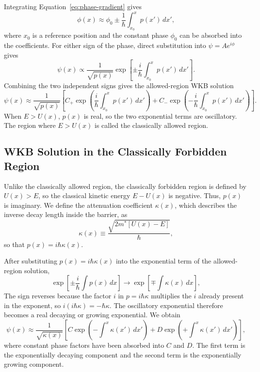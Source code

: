 \documentclass[12pt]{article}
\begin{document}
Integrating Equation~\eqref{eq:phase-gradient} gives
\begin{equation}
    \phi(x)\approx\phi_0
    \pm\frac{1}{\hbar}\int_{x_0}^{x}p(x')\,dx',
    \label{eq:wkb-phase}
\end{equation}
where \(x_0\) is a reference position and the constant phase \(\phi_0\) can be absorbed into the coefficients. For either sign of the phase, direct substitution into \(\psi=Ae^{i\phi}\) gives
\[
    \psi(x)\propto
    \frac{1}{\sqrt{p(x)}}
    \exp\left[
        \pm\frac{i}{\hbar}\int_{x_0}^{x}p(x')\,dx'
    \right].
\]
Combining the two independent signs gives the allowed-region WKB solution
\begin{equation}
    \psi(x)\approx
    \frac{1}{\sqrt{p(x)}}
    \left[
        C_{+}\exp\left(\frac{i}{\hbar}\int_{x_0}^{x}p(x')\,dx'\right)
        +C_{-}\exp\left(-\frac{i}{\hbar}\int_{x_0}^{x}p(x')\,dx'\right)
    \right].
    \label{eq:allowed-wkb}
\end{equation}
When \(E>U(x)\), \(p(x)\) is real, so the two exponential terms are oscillatory. The region where \(E>U(x)\) is called the classically allowed region.

\subsection{WKB Solution in the Classically Forbidden Region}
Unlike the classically allowed region, the classically forbidden region is defined by \(U(x)>E\), so the classical kinetic energy \(E-U(x)\) is negative. Thus, \(p(x)\) is imaginary. We define the attenuation coefficient \(\kappa(x)\), which describes the inverse decay length inside the barrier, as
\begin{equation}
    \kappa(x)\equiv
    \frac{\sqrt{2m^*[U(x)-E]}}{\hbar},
    \label{eq:kappa}
\end{equation}
so that \(p(x)=i\hbar\kappa(x)\).

After substituting \(p(x)=i\hbar\kappa(x)\) into the exponential term of the allowed-region solution,
\begin{equation}
    \exp\left[\pm\frac{i}{\hbar}\int p(x)\,dx\right]
    \longrightarrow
    \exp\left[\mp\int\kappa(x)\,dx\right],
    \label{eq:forbidden-exponential}
\end{equation}
The sign reverses because the factor \(i\) in \(p=i\hbar\kappa\) multiplies the \(i\) already present in the exponent, so \(i(i\hbar\kappa)=-\hbar\kappa\). The oscillatory exponential therefore becomes a real decaying or growing exponential. We obtain
\begin{equation}
    \psi(x)\approx
    \frac{1}{\sqrt{\kappa(x)}}
    \left[
        C\exp\left(-\int^{x}\kappa(x')\,dx'\right)
        +D\exp\left(+\int^{x}\kappa(x')\,dx'\right)
    \right],
    \label{eq:forbidden-wkb}
\end{equation}
where constant phase factors have been absorbed into \(C\) and \(D\).
The first term is the exponentially decaying component and the second term is the exponentially growing component. 
\end{document}
